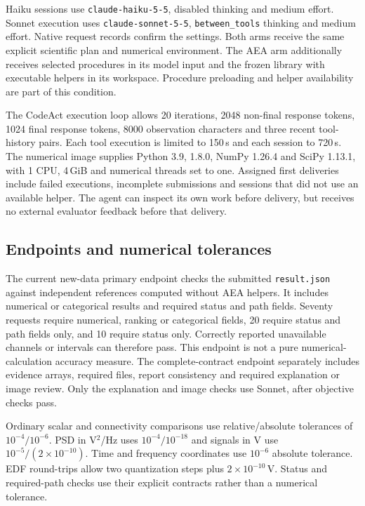 Haiku sessions use \texttt{claude-haiku-5-5}, disabled thinking and medium effort. Sonnet execution uses \texttt{claude-sonnet-5-5}, \texttt{between\_tools} thinking and medium effort. Native request records confirm the settings. Both arms receive the same explicit scientific plan and numerical environment. The AEA arm additionally receives selected procedures in its model input and the frozen library with executable helpers in its workspace. Procedure preloading and helper availability are part of this condition.

The CodeAct execution loop allows 20 iterations, 2048 non-final response tokens, 1024 final response tokens, 8000 observation characters and three recent tool-history pairs. Each tool execution is limited to 150\,s and each session to 720\,s. The numerical image supplies Python 3.9, \mne{} 1.8.0, NumPy 1.26.4 and SciPy 1.13.1, with 1 CPU, 4\,GiB and numerical threads set to one. Assigned first deliveries include failed executions, incomplete submissions and sessions that did not use an available helper. The agent can inspect its own work before delivery, but receives no external evaluator feedback before that delivery.

\subsection*{Endpoints and numerical tolerances}
The current new-data primary endpoint checks the submitted \texttt{result.json} against independent references computed without AEA helpers. It includes numerical or categorical results and required status and path fields. Seventy requests require numerical, ranking or categorical fields, 20 require status and path fields only, and 10 require status only. Correctly reported unavailable channels or intervals can therefore pass. This endpoint is not a pure numerical-calculation accuracy measure. The complete-contract endpoint separately includes evidence arrays, required files, report consistency and required explanation or image review. Only the explanation and image checks use Sonnet, after objective checks pass.

Ordinary scalar and connectivity comparisons use relative/absolute tolerances of $10^{-4}/10^{-6}$. PSD in V$^2$/Hz uses $10^{-4}/10^{-18}$ and signals in V use $10^{-5}/(2\times10^{-10})$. Time and frequency coordinates use $10^{-6}$ absolute tolerance. EDF round-trips allow two quantization steps plus $2\times10^{-10}$\,V. Status and required-path checks use their explicit contracts rather than a numerical tolerance.

